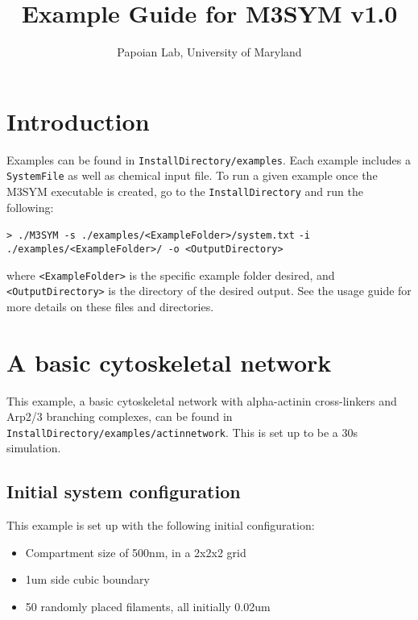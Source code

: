 \documentclass[11pt, oneside]{article}   	%
\title{Example Guide for M3SYM v1.0}
\author{Papoian Lab, University of Maryland}
\date{}							%
\begin{document}
\maketitle

\tableofcontents
\newpage

\section{Introduction}

Examples can be found in \texttt{InstallDirectory/examples}. Each example includes a \texttt{SystemFile} as well as chemical input file. To run a given example once the M3SYM executable is created, go to the \texttt{InstallDirectory} and run the following:\newline

\indent \texttt{> ./M3SYM -s ./examples/<ExampleFolder>/system.txt}\newline
\indent\indent \texttt{-i ./examples/<ExampleFolder>/  -o <OutputDirectory>}\newline

\noindent where \texttt{<ExampleFolder>} is the specific example folder desired, and \texttt{<OutputDirectory>} is the directory of the desired output. See the usage guide for more details on these files and directories.


\section{A basic cytoskeletal network}

This example, a basic cytoskeletal network with alpha-actinin cross-linkers and Arp2/3 branching complexes, can be found in
\texttt{InstallDirectory/examples/actinnetwork}. This is set up to be a 30s simulation.

\subsection{Initial system configuration}
 
 This example is set up with the following initial configuration:
 
 \begin{itemize}
 \item Compartment size of 500nm, in a 2x2x2 grid 
 \item 1um side cubic boundary
 \item 50 randomly placed filaments, all initially 0.02um
 \end{itemize}
\end{document}
